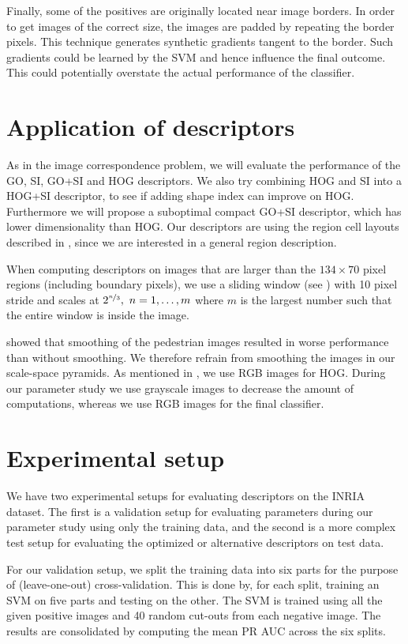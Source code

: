\documentclass[thesis.tex]{subfiles}
\begin{document}
Finally, some of the positives are originally located near image borders. In order to get images of the correct size, the images are padded by repeating the border pixels. This technique generates synthetic gradients tangent to the border. Such gradients could be learned by the SVM and hence influence the final outcome. This could potentially overstate the actual performance of the classifier.
%
\section{Application of descriptors}
\label{sec:inriaDescriptorApplication}
%
As in the image correspondence problem, we will evaluate the performance of the GO, SI, GO+SI and HOG descriptors. We also try combining HOG and SI into a HOG+SI descriptor, to see if adding shape index can improve on HOG. Furthermore we will propose a suboptimal compact GO+SI descriptor, which has lower dimensionality than HOG.
Our descriptors are using the region cell layouts described in , since we are interested in a general region description.

When computing descriptors on images that are larger than the $134 \times 70$ pixel regions (including boundary pixels), we use a sliding window (see ) with 10 pixel stride and scales at $2^{\nicefrac{n}{3}},~n=1,\hdots,m$ where $m$ is the largest number such that the entire window is inside the image. 

\citet{dalal2005histograms} showed that smoothing of the pedestrian images resulted in worse performance than without smoothing. We therefore refrain from smoothing the images in our scale-space pyramids. As mentioned in , we use RGB images for HOG. During our parameter study we use grayscale images to decrease the amount of computations, whereas we use RGB images for the final classifier.
%
\section{Experimental setup}
\label{sec:inriaExperimentalSetup}
%
We have two experimental setups for evaluating descriptors on the INRIA dataset. The first is a validation setup for evaluating parameters during our parameter study using only the training data, and the second is a more complex test setup for evaluating the optimized or alternative descriptors on test data.

For our validation setup, we split the training data into six parts for the purpose of (leave-one-out) cross-validation. This is done by, for each split, training an SVM on five parts and testing on the other. The SVM is trained using all the given positive images and 40 random cut-outs from each negative image. The results are consolidated by computing the mean PR AUC across the six splits.
\end{document}
